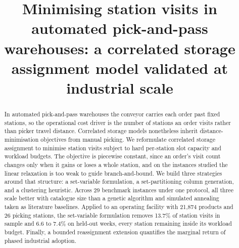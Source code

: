 \documentclass[]{interact}
\begin{document}

\title{Minimising station visits in automated pick-and-pass warehouses: a correlated storage assignment model validated at industrial scale}

\author{
}

\maketitle

\begin{abstract}
In automated pick-and-pass warehouses the conveyor carries each order past fixed stations, so the operational cost driver is the number of stations an order visits rather than picker travel distance. Correlated storage models nonetheless inherit distance-minimisation objectives from manual picking. We reformulate correlated storage assignment to minimise station visits subject to hard per-station slot capacity and workload budgets. The objective is piecewise constant, since an order's visit count changes only when it gains or loses a whole station, and on the instances studied the linear relaxation is too weak to guide branch-and-bound. We build three strategies around that structure: a set-variable formulation, a set-partitioning column generation, and a clustering heuristic. Across 29 benchmark instances under one protocol, all three scale better with catalogue size than a genetic algorithm and simulated annealing taken as literature baselines. Applied to an operating facility with 21,874 products and 26 picking stations, the set-variable formulation removes 13.7\% of station visits in sample and 6.6 to 7.4\% on held-out weeks, every station remaining inside its workload budget. Finally, a bounded reassignment extension quantifies the marginal return of phased industrial adoption.
\end{abstract}
\end{document}
